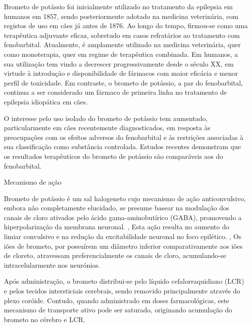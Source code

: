 Brometo de potássio foi inicialmente utilizado no tratamento da epilepsia em humanos em 1857, sendo posteriormente adotado na medicina veterinária, com registos de uso em cães já antes de 1876. \cite{javmakbr} Ao longo do tempo, firmou-se como uma terapêutica adjuvante eficaz, sobretudo em casos refratários ao tratamento com fenobarbital.  \cite{Lichtenauer2022} Atualmente, é amplamente utilizado na medicina veterinária, quer como monoterapia, quer em regime de terapêutica combinada. \cite{Lichtenauer2022}\cite{Fantinati2021}\cite{Gouveia2024} \cite{Dr}\cite{vol16} Em humanos, a sua utilização tem vindo a decrescer progressivamente desde o século XX, \cite{Lichtenauer2022} \cite{Dr} em virtude à introdução e disponibilidade de fármacos com maior eficácia e menor perfil de toxicidade. \cite{Lichtenauer2022} Em contraste, o brometo de potássio, a par do fenobarbital, continua a ser considerado um fármaco de primeira linha no tratamento de epilepsia idiopática em cães. \cite{javmakbr} 


O interesse pelo uso isolado do brometo de potássio tem aumentado, particularmente em cães recentemente diagnosticados, em resposta às preocupações com os efeitos adversos do fenobarbital e às restrições associadas à sua classificação como substância controlada. \cite{javmakbr} Estudos recentes demonstram que os resultados terapêuticos do brometo de potássio são comparáveis aos do fenobarbital. \cite{Lichtenauer2022} 


Mecanismo de ação


Brometo de potássio é um sal halogeneto \cite{javmakbr} cujo mecanismo de ação anticonvulsivo, embora não completamente elucidado, se presume basear na modulação dos canais de cloro ativados pelo ácido gama-aminobutírico (GABA), promovendo a hiperpolarização da membrana neuronal. \cite{javmakbr}, \cite{Fantinati2021} \cite{Gouveia2024} Esta ação resulta no aumento do limiar convulsivo e na redução da excitabilidade neuronal no foco epilético. \cite{javmakbr}, \cite{Fantinati2021} \cite{Gouveia2024} Os iões de brometo, por possuírem um diâmetro inferior comparativamente aos iões de cloreto, atravessam preferencialmente os canais de cloro, acumulando-se intracelularmente nos neurónios. \cite{javmakbr} \cite{Gouveia2024} 


Após administração, o brometo distribui-se pelo líquido cefalorraquidiano (LCR) e pelos tecidos intersticiais cerebrais, sendo removido principalmente através do plexo coróide. \cite{javmakbr} Contudo, quando administrado em doses farmacológicas, este mecanismo de transporte ativo pode ser saturado, originando acumulação do brometo no cérebro e LCR. \cite{javmakbr}

